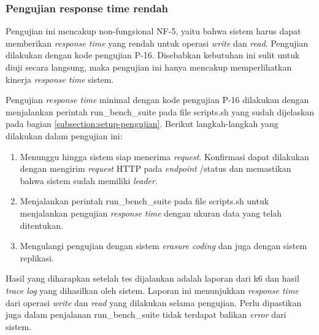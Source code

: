 \subsubsection{Pengujian response time rendah}
\label{subsubsection:pengujian-response-time-rendah}

Pengujian ini mencakup non-fungsional NF-5, yaitu bahwa sistem harus dapat memberikan \textit{response time} yang rendah untuk operasi \textit{write} dan \textit{read}. Pengujian dilakukan dengan kode pengujian P-16. Disebabkan kebutuhan ini sulit untuk diuji secara langsung, maka pengujian ini hanya mencakup memperlihatkan kinerja \textit{response time} sistem.


Pengujian \textit{response time} minimal dengan kode pengujian P-16 dilakukan dengan menjalankan perintah run\_bench\_suite pada file scripts.sh yang sudah dijelaskan pada bagian \ref{subsection:setup-pengujian}. Berikut langkah-langkah yang dilakukan dalam pengujian ini:

\begin{enumerate}
  \item Menunggu hingga sistem siap menerima \textit{request}. Konfirmasi dapat dilakukan dengan mengirim \textit{request} HTTP pada \textit{endpoint} /status dan memastikan bahwa sistem sudah memiliki \textit{leader}.
  \item Menjalankan perintah run\_bench\_suite pada file scripts.sh untuk menjalankan pengujian \textit{response time} dengan ukuran data yang telah ditentukan.
  \item Mengulangi pengujian dengan sistem \textit{erasure coding} dan juga dengan sistem replikasi.
\end{enumerate}

Hasil yang diharapkan setelah tes dijalankan adalah laporan dari k6 dan hasil \textit{trace log} yang dihasilkan oleh sistem. Laporan ini menunjukkan \textit{response time} dari operasi \textit{write} dan \textit{read} yang dilakukan selama pengujian. Perlu dipastikan juga dalam penjalanan run\_bench\_suite tidak terdapat balikan \textit{error} dari sistem.

